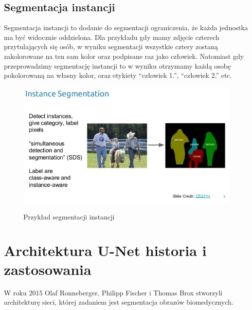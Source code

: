 \documentclass{article}
\begin{document}
\subsection{Segmentacja instancji}
Segmentacja instancji to dodanie do segmentacji ograniczenia, że każda jednostka ma być widocznie oddzielona.
Dla przykładu gdy mamy zdjęcie czterech przytulających się osób, w wyniku segmentacji wszystkie cztery zostaną zakolorowane na ten sam kolor oraz podpisane raz jako człowiek.
Natomiast gdy przeprowadzimy segmentację instancji to w wyniku otrzymamy każdą osobę pokolorowaną na własny kolor, oraz etykiety ``człowiek 1.'', ``człowiek 2.'' etc.
\begin{figure}[H]
    \centering
    \includegraphics[width=\linewidth]{images/segmentacja_instancji.jpeg}
    \caption{Przykład segmentacji instancji}
    \cite{unet}
    \label{fig:segmentacja_instancji}
\end{figure}
\newpage
\section{Architektura U-Net historia i zastosowania}
W roku 2015 Olaf Ronneberger, Philipp Fischer i Thomas Brox stworzyli architekturę sieci, której zadaniem jest segmentacja obrazów biomedycznych.
\end{document}
